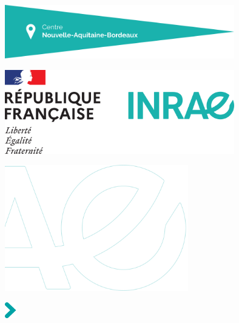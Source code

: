 \makeatletter
\let\inserttitle\@title
\makeatother
\makeatletter
\let\insertauthor\@author
\makeatother
\makeatletter
\let\insertdate\@date
\makeatother


\vspace*{-4.5cm}

%

\vspace*{12.15cm}

\hspace{-2.7cm}
\includegraphics[width=10cm]{ressources/cartouche}\par

\hspace{12cm}
\includegraphics[width=10cm]{ressources/bloc-etat}\par
\vspace*{-2cm}

\hspace{-2.8cm}
\includegraphics[width=8cm]{ressources/sigle-inrae}

\vspace*{1cm}

\hspace{-1cm}
\setlength{\parindent}{0cm}
\includegraphics[width=0.5cm]{ressources/fleche-titre}\hspace{0.3cm}\textcolor{inrae}{\sffamily\Huge\bfseries \inserttitle}\par\bigskip

